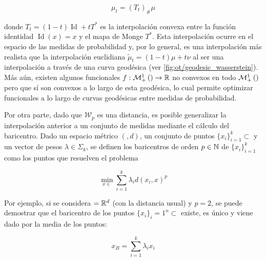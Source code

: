 \begin{equation*}
	\mu_t = (T_t)_\#\mu
\end{equation*}

donde $T_t = (1-t)\operatorname{Id} + t T^*$ es la interpolación convexa entre la función identidad $\operatorname{Id}(x)=x$ y el mapa de Monge $T^*$. Esta interpolación ocurre en el espacio de las medidas de probabilidad y, por lo general, es una interpolación más realista que la interpolación euclidiana $\tilde{\mu}_t = (1-t)\mu + t\nu$ al ser una interpolación a través de una curva geodésica (ver \autoref{fig:ot/geodesic_wasserstein}). Más aún, existen algunos funcionales $f:\mathcal{M}_+^1\left(\right)\to\mathbb{R}$ no convexos en todo $\mathcal{M}_+^1\left(\right)$ pero que sí son convexos a lo largo de esta geodésica, lo cual permite optimizar funcionales a lo largo de curvas geodésicas entre medidas de probabilidad.





Por otra parte, dado que $\mathcal{W}_p$ es una distancia, es posible generalizar la interpolación anterior a un conjunto de medidas mediante el cálculo del baricentro. Dado un espacio métrico $(\xspace,d)$, un conjunto de puntos $\{x_i\}_{i=1}^k\subset\xspace$ y un vector de pesos $\lambda\in\Sigma_k$, se definen los baricentros de orden $p\in\mathbb{N}$ de $\{x_i\}_{i=1}^k$ como los puntos que resuelven el problema

\begin{equation}
	\label{eq:barycenter}
	\min_{x\in\xspace} \sum_{i=1}^k \lambda_i d(x_i,x)^p
\end{equation}

Por ejemplo, si se considera $=\mathbb{R}^d$ (con la distancia usual) y $p=2$, se puede demostrar que el baricentro de los puntos $\{x_i\}_i=1^n\subset\xspace$ existe, es único y viene dado por la media de los puntos:

\begin{equation}
	\label{eq:barycenter_rd}
	x_B = \sum_{i=1}^k \lambda_i x_i
\end{equation}

